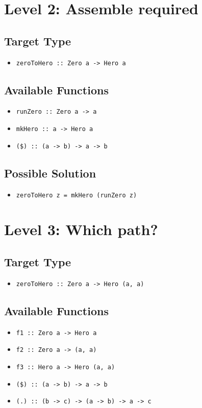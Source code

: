 \section{Level 2: Assemble required}

\subsection*{Target Type} 
\begin{itemize}
    \item \texttt{zeroToHero :: Zero a -> Hero a}
\end{itemize}

\subsection*{Available Functions} 
\begin{itemize}
    \item \texttt{runZero :: Zero a -> a}
    \item \texttt{mkHero :: a -> Hero a}
    \item \texttt{(\$) :: (a -> b) -> a -> b}
\end{itemize}

\subsection*{Possible Solution} 
\begin{itemize}
    \item \texttt{zeroToHero z = mkHero (runZero z)}
\end{itemize}

\section{Level 3: Which path?}
\subsection*{Target Type } 
\begin{itemize}
    \item \texttt{zeroToHero :: Zero a -> Hero (a, a)}
\end{itemize}

\subsection*{Available Functions} 
\begin{itemize}
    \item \texttt{f1 :: Zero a -> Hero a}
    \item \texttt{f2 :: Zero a -> (a, a)}
    \item \texttt{f3 :: Hero a -> Hero (a, a)}
    \item \texttt{(\$) :: (a -> b) -> a -> b}
    \item \texttt{(.) :: (b -> c) -> (a -> b) -> a -> c}
\end{itemize}

